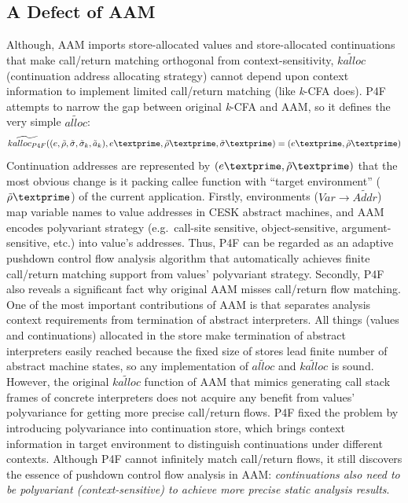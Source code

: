 \documentclass{article}
\begin{document}
\subsection{A Defect of AAM}
\label{sub:Defect}
Although, AAM imports store-allocated values and store-allocated continuations that make call/return matching orthogonal from context-sensitivity, $\widetilde{kalloc}$ (continuation address allocating strategy) cannot depend upon context information to implement limited call/return matching (like \textit{k}-CFA does).
P4F attempts to narrow the gap between original \textit{k}-CFA and AAM, so it defines the very simple $\widetilde{alloc}$:
\[
\widetilde{kalloc_{P4F}} ((e, \tilde{\rho}, \tilde{\sigma}, \tilde{\sigma}_k, \tilde{a}_k), e\textprime, \tilde{\rho}\textprime, \tilde{\sigma}\textprime) = (e\textprime, \tilde{\rho}\textprime)
\]
Continuation addresses are represented by $(e\textprime, \tilde{\rho}\textprime)$ that the most obvious change is it packing callee function with ``target environment'' ($\tilde{\rho}\textprime$) of the current application.
Firstly, environments ($Var \to \widetilde{Addr}$) map variable names to value addresses in CESK abstract machines, and AAM encodes polyvariant strategy (e.g.\ call-site sensitive, object-sensitive, argument-sensitive, etc.) into value's addresses.
Thus, P4F can be regarded as an adaptive pushdown control flow analysis algorithm that automatically achieves finite call/return matching support from values' polyvariant strategy. %
Secondly, P4F also reveals a significant fact why original AAM misses call/return flow matching.
One of the most important contributions of AAM is that separates analysis context requirements from termination of abstract interpreters.
All things (values and continuations) allocated in the store make termination of abstract interpreters easily reached because the fixed size of stores lead finite number of abstract machine states, so any implementation of $\widetilde{alloc}$ and $\widetilde{kalloc}$ is sound.
However, the original $\widetilde{kalloc}$ function of AAM that mimics generating call stack frames of concrete interpreters does not acquire any benefit from values' polyvariance for getting more precise call/return flows.
P4F fixed the problem by introducing polyvariance into continuation store, which brings context information in target environment to distinguish continuations under different contexts.
Although P4F cannot infinitely match call/return flows, it still discovers the essence of pushdown control flow analysis in AAM\@: \emph{continuations also need to be polyvariant (context-sensitive) to achieve more precise static analysis results}.
\end{document}
